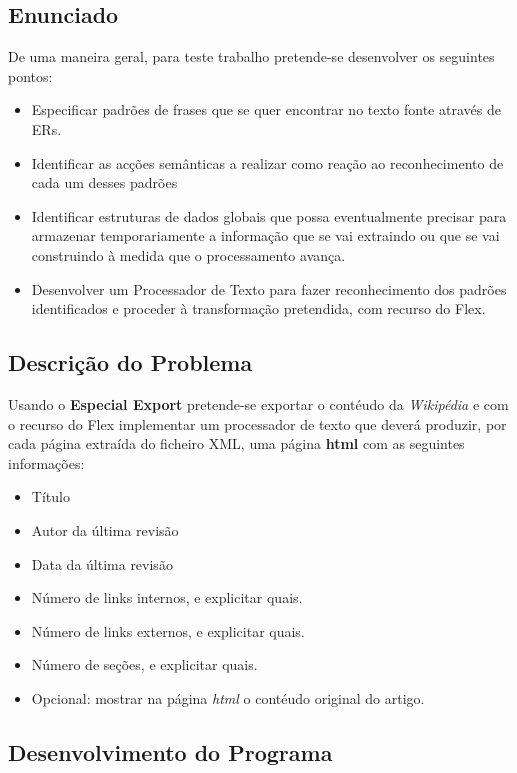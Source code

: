 \documentclass[11pt, a4paper, oneside]{article}
\begin{document}
\subsection{Enunciado}

De uma maneira geral, para teste trabalho pretende-se desenvolver os seguintes pontos:
\begin{itemize}
\item Especificar padrões de frases que se quer encontrar no texto fonte através de ERs.
\item Identificar as acções semânticas a realizar como reação ao reconhecimento de cada um desses padrões
\item Identificar estruturas de dados globais que possa eventualmente precisar para armazenar temporariamente a informação que se vai extraindo ou que se vai construindo à medida que o processamento avança.
\item Desenvolver um Processador de Texto para fazer reconhecimento dos padrões identificados e proceder à transformação pretendida, com recurso do Flex.
\end{itemize}

\subsection{Descrição do Problema}

Usando o \textbf{Especial Export} pretende-se exportar o contéudo da \textit{Wikipédia} e com o recurso do Flex implementar um processador de texto que deverá produzir, por cada página extraída do ficheiro XML, uma página \textbf{html} com as seguintes informações:

\begin{itemize}
\item Título
\item Autor da última revisão
\item Data da última revisão
\item Número de links internos, e explicitar quais.
\item Número de links externos, e explicitar quais.
\item Número de seções, e explicitar quais.
\item Opcional: mostrar na página \textit{html} o contéudo original do artigo.
\end{itemize}

\newpage

\subsection{Desenvolvimento do Programa}
\end{document}
